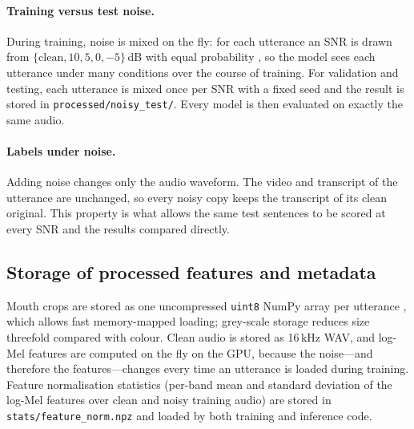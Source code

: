 \paragraph{Training versus test noise.}
During training, noise is mixed on the fly: for each utterance an SNR is drawn
from $\{\text{clean}, 10, 5, 0, -5\}$\,dB with equal probability \rec, so the
model sees each utterance under many conditions over the course of training.
For validation and testing, each utterance is mixed once per SNR with a fixed
seed and the result is stored in \texttt{processed/noisy\_test/}. Every model
is then evaluated on exactly the same audio.

\paragraph{Labels under noise.}
Adding noise changes only the audio waveform. The video and transcript of the
utterance are unchanged, so every noisy copy keeps the transcript of its clean
original. This property is what allows the same test sentences to be scored at
every SNR and the results compared directly.

\subsection{Storage of processed features and metadata}
Mouth crops are stored as one uncompressed \texttt{uint8} NumPy array per
utterance \rec, which allows fast memory-mapped loading; grey-scale storage
reduces size threefold compared with colour. Clean audio is stored as 16\,kHz
WAV, and log-Mel features are computed on the fly on the GPU, because the
noise---and therefore the features---changes every time an utterance is
loaded during training. Feature normalisation statistics (per-band mean and
standard deviation of the log-Mel features over clean and noisy training audio)
are stored in \texttt{stats/feature\_norm.npz} and loaded by both training and
inference code.
